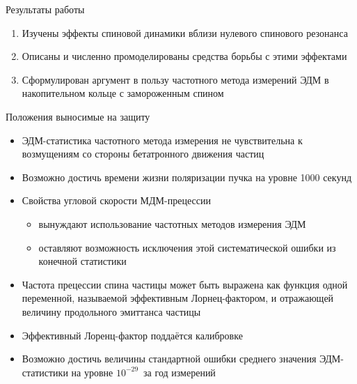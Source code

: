 \documentclass[14pt]{beamer}
\begin{document}
\begin{frame}{Результаты работы}
	\begin{enumerate}
		\item Изучены эффекты спиновой динамики вблизи нулевого спинового резонанса
		\item Описаны и численно промоделированы средства борьбы с этими эффектами
		\item Сформулирован аргумент в пользу частотного метода измерений ЭДМ в накопительном кольце с замороженным спином
	\end{enumerate}
\end{frame}

\begin{frame}{Положения выносимые на защиту}
\begin{itemize}
	\item ЭДМ-статистика частотного метода измерения не чувствительна к возмущениям со стороны бетатронного движения частиц
	\item Возможно достичь времени жизни поляризации пучка на уровне 1000 секунд
	\item Свойства угловой скорости МДМ-прецессии 
	\begin{itemize}
		\item вынуждают использование частотных методов измерения ЭДМ
		\item оставляют возможность исключения этой систематической ошибки из конечной статистики
	\end{itemize}
\end{itemize}
\end{frame}
\begin{frame}
\begin{itemize}
\item Частота прецессии спина частицы может быть выражена как функция одной переменной, называемой эффективным Лорнец-фактором, и отражающей величину продольного эмиттанса частицы
\item Эффективный Лоренц-фактор поддаётся калибровке
\item Возможно достичь величины стандартной ошибки среднего значения ЭДМ-статистики на уровне $10^{-29}$\ecm~за год измерений
\end{itemize}
\end{frame}

\end{document}
